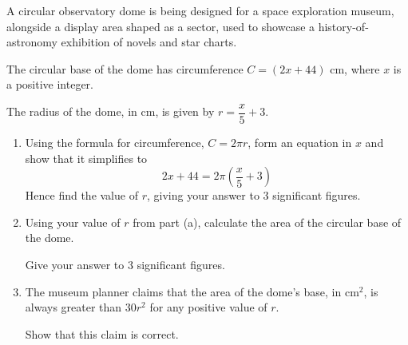 \begin{question}
\noindent A circular observatory dome is being designed for a space exploration museum, alongside a display area shaped as a sector, used to showcase a history-of-astronomy exhibition of novels and star charts.

The circular base of the dome has circumference $C = (2x + 44)$ cm, where $x$ is a positive integer.

\begin{center}
\end{center}

\noindent The radius of the dome, in cm, is given by $r = \dfrac{x}{5} + 3$.

\begin{enumerate}
    \item[(a)] Using the formula for circumference, $C = 2\pi r$, form an equation in $x$ and show that it simplifies to
    \[
    2x + 44 = 2\pi\left(\frac{x}{5} + 3\right)
    \]
    Hence find the value of $r$, giving your answer to 3 significant figures.
    \vspace{4cm}

    \item[(b)] Using your value of $r$ from part (a), calculate the area of the circular base of the dome.

    Give your answer to 3 significant figures.
    \vspace{3.5cm}

    \item[(c)] The museum planner claims that the area of the dome's base, in cm$^2$, is always greater than $30r^2$ for any positive value of $r$.

    Show that this claim is correct.
    \vspace{3cm}
\end{enumerate}
\end{question}
